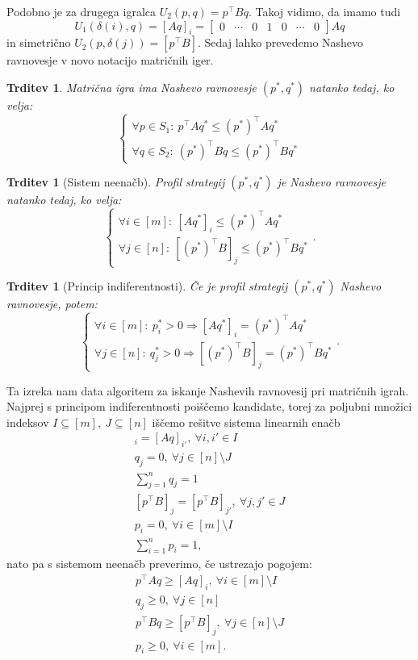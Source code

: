 \documentclass[10pt, a4paper]{article}
\newtheorem{trditev}[izr]{Trditev}
\begin{document}
Podobno je za drugega igralca $U_2 (p, q) = p^\top B q$.
Takoj vidimo, da imamo tudi 
$$U_1 (\delta(i), q) = \left[Aq\right]_i = \begin{bmatrix}
  0 & \cdots & 0 & 1 & 0 & \cdots & 0
\end{bmatrix} Aq$$
in simetrično $U_2 (p, \delta(j)) = [p^\top B]$.
Sedaj lahko prevedemo Nashevo ravnovesje v novo notacijo matričnih iger.
\begin{trditev}
  Matrična igra ima Nashevo ravnovesje $(p^*, q^*)$ natanko tedaj, ko velja:
  $$\begin{cases}
    \forall p \in S_1:\ p^\top A q^* \leq (p^*)^\top A q^*\\
    \forall q \in S_2:\ (p^*)^\top B q \leq (p^*)^\top B q^*
  \end{cases}
  $$
\end{trditev}
\begin{trditev}[Sistem neenačb]
  Profil strategij $(p^*, q^*)$ je Nashevo ravnovesje natanko tedaj, ko velja:
  $$\begin{cases}
    \forall i \in [m]:\ [A q^*]_i \leq (p^*)^\top A q^*\\
    \forall j \in [n]:\ [(p^*)^\top B]_j \leq (p^*)^\top B q^*
  \end{cases}.
  $$
\end{trditev}
\begin{trditev}[Princip indiferentnosti]
  Če je profil strategij $(p^*, q^*)$ Nashevo ravnovesje, potem:
  $$\begin{cases}
    \forall i \in [m]:\ p_i^* > 0 \Rightarrow [A q^*]_i = (p^*)^\top A q^*\\
    \forall j \in [n]:\ q_j^* > 0 \Rightarrow [(p^*)^\top B]_j = (p^*)^\top B q^*
  \end{cases}.
  $$
\end{trditev}
Ta izreka nam data algoritem za iskanje Nashevih ravnovesij pri matričnih igrah.
Najprej s principom indiferentnosti poiščemo kandidate, torej za poljubni 
množici indeksov $I \subseteq [m],\ J \subseteq [n]$ iščemo rešitve sistema linearnih enačb 
    \begin{gather}
      [Aq]_i = [Aq]_{i'},\ \forall i, i' \in I \tag{$3$} \label{eq:3}\\
      q_j = 0,\ \forall j \in [n]\setminus J \nonumber\\
      \sum_{j = 1} ^n q_j = 1 \nonumber\\
      [p^\top B]_j = [p^\top B]_{j'},\ \forall j, j' \in J \nonumber\\
      p_i = 0,\ \forall i \in [m] \setminus I \nonumber\\
      \sum_{i = 1} ^n p_i = 1 \nonumber,
    \end{gather}
nato pa s sistemom neenačb preverimo,
če ustrezajo pogojem:
\begin{gather*}
  p^\top A q \geq [Aq]_i,\ \forall i \in [m] \setminus I \tag{$4$} \label{eq:4}\\
  q_j \geq 0,\ \forall j \in [n] \nonumber\\
  p^\top B q \geq [p^\top B]_j,\ \forall j \in [n]\setminus J \nonumber\\
  p_i \geq 0,\ \forall i \in [m] \nonumber.
\end{gather*} 
\end{document}
